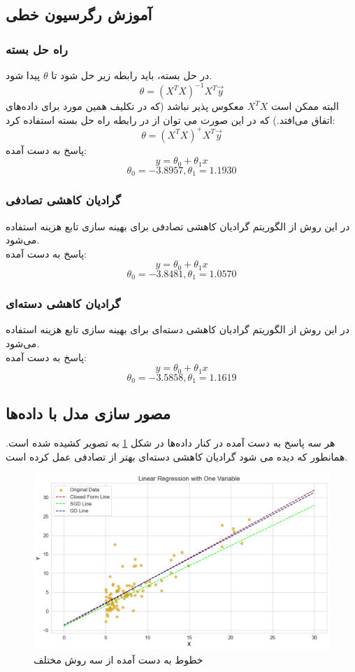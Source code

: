 \documentclass{article}
\begin{document}
	\subsection{آموزش رگرسیون خطی}
	\subsubsection{راه حل بسته}
	در حل بسته، باید رابطه زیر حل شود تا $\theta$ پیدا شود.
	$$\theta = (X^TX)^{-1}X^T\vec{y}$$
	البته ممکن است
	$X^TX$
	معکوس پذیر نباشد (که در تکلیف همین مورد برای داده‌های  اتفاق می‌افتد.) که در این صورت می توان از 
	در رابطه راه حل بسته استفاده کرد:
	$$\theta = (X^TX)^{+}X^T\vec{y}$$
	پاسخ به دست آمده:
	$$
	y = \theta_0 + \theta_1x
	$$
	$$
	\theta_0 = -3.8957 , \theta_1 = 1.1930
	$$
	\newpage
	\subsubsection{گرادیان کاهشی تصادفی}
	در این روش از الگوریتم گرادیان کاهشی تصادفی برای بهینه سازی تابع هزینه استفاده می‌شود.\\
	پاسخ به دست آمده:
	$$
	y = \theta_0 + \theta_1x
	$$
	$$
	\theta_0 = -3.8481, \theta_1 = 1.0570
	$$
	\subsubsection{گرادیان کاهشی دسته‌ای}
	در این روش از الگوریتم گرادیان کاهشی دسته‌ای برای بهینه سازی تابع هزینه استفاده می‌شود.\\
	پاسخ به دست آمده:
	$$
	y = \theta_0 + \theta_1x
	$$
	$$
	\theta_0 = -3.5858, \theta_1 = 1.1619
	$$
	\subsection{مصور سازی مدل با داده‌ها}
	هر سه پاسخ به دست آمده در کنار داده‌ها در شکل 
	\ref{fig: model with data}
	 به تصویر کشیده شده است.‌ همانطور که دیده می شود گرادیان کاهشی دسته‌ای بهتر از تصادفی عمل کرده است.
	\begin{figure}[H]
	 	\centering
	 	\includegraphics[scale=0.5]{figs/model_with_data}
	 	\caption{خطوط به دست آمده از سه روش مختلف}
	 	\label{fig: model with data}
	\end{figure}
	 
\end{document}
